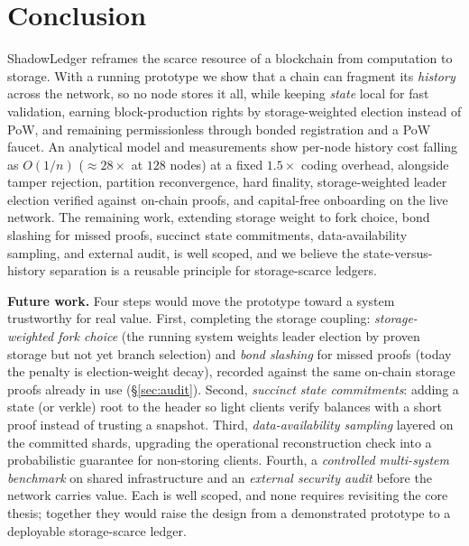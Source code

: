 \section{Conclusion}
\label{sec:concl}
ShadowLedger reframes the scarce resource of a blockchain from computation to storage. With a
running prototype we show that a chain can fragment its \emph{history} across the
network, so no node stores it all, while keeping \emph{state} local for fast validation,
earning block-production rights by storage-weighted election instead of PoW, and remaining
permissionless through bonded registration and a PoW faucet. An analytical model and measurements
show per-node history cost falling as $O(1/n)$ ($\approx 28\times$ at $128$ nodes) at a fixed
$1.5\times$ coding overhead, alongside tamper rejection, partition reconvergence, hard finality,
storage-weighted leader election verified against on-chain proofs, and capital-free onboarding on
the live network. The remaining work, extending storage weight to fork choice, bond slashing for
missed proofs, succinct state commitments, data-availability sampling, and external audit, is well
scoped, and we believe the state-versus-history separation is a reusable principle for
storage-scarce ledgers.

\textbf{Future work.} Four steps would move the prototype toward a system trustworthy for real
value. First, completing the storage coupling: \emph{storage-weighted fork choice} (the running
system weights leader election by proven storage but not yet branch selection) and \emph{bond
slashing} for missed proofs (today the penalty is election-weight decay), recorded against the
same on-chain storage proofs already in use (\S\ref{sec:audit}). Second, \emph{succinct
state commitments}: adding a state (or verkle) root to the header so light clients verify balances
with a short proof instead of trusting a snapshot. Third, \emph{data-availability sampling} layered
on the committed shards, upgrading the operational reconstruction check into a probabilistic
guarantee for non-storing clients. Fourth, a \emph{controlled multi-system benchmark} on shared
infrastructure and an \emph{external security audit} before the network carries value. Each is
well scoped, and none requires revisiting the core thesis; together they would raise the design
from a demonstrated prototype to a deployable storage-scarce ledger.
